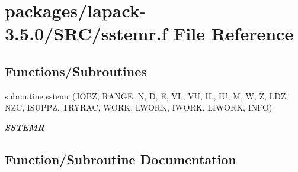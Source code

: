 \hypertarget{sstemr_8f}{}\section{packages/lapack-\/3.5.0/\+S\+R\+C/sstemr.f File Reference}
\label{sstemr_8f}
\subsection*{Functions/\+Subroutines}
\begin{DoxyCompactItemize}
\item 
subroutine \hyperlink{sstemr_8f_a6f79c320fcafc13559dd954f648858e7}{sstemr} (J\+O\+B\+Z, R\+A\+N\+G\+E, \hyperlink{polmisc_8c_a0240ac851181b84ac374872dc5434ee4}{N}, \hyperlink{odrpack_8h_a7dae6ea403d00f3687f24a874e67d139}{D}, E, V\+L, V\+U, I\+L, I\+U, M, W, Z, L\+D\+Z, N\+Z\+C, I\+S\+U\+P\+P\+Z, T\+R\+Y\+R\+A\+C, W\+O\+R\+K, L\+W\+O\+R\+K, I\+W\+O\+R\+K, L\+I\+W\+O\+R\+K, I\+N\+F\+O)
\begin{DoxyCompactList}\small\item\em {\bfseries S\+S\+T\+E\+M\+R} \end{DoxyCompactList}\end{DoxyCompactItemize}


\subsection{Function/\+Subroutine Documentation}
\hypertarget{sstemr_8f_a6f79c320fcafc13559dd954f648858e7}{}
